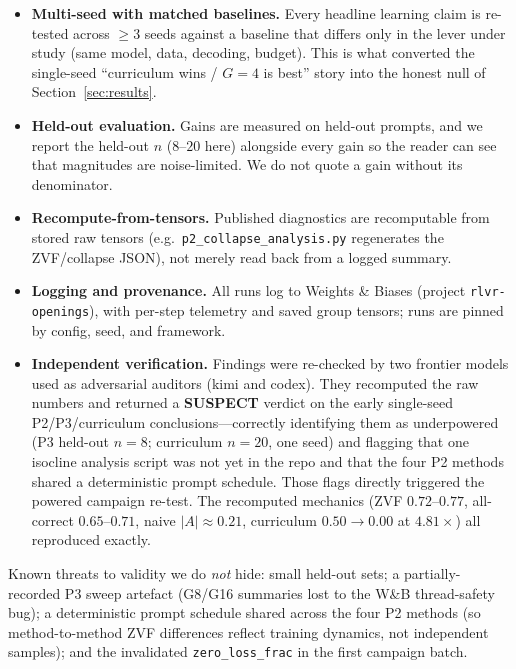\documentclass[12pt,a4paper]{report}
\begin{document}
\begin{itemize}[leftmargin=1.4em,itemsep=2pt]
  \item \textbf{Multi-seed with matched baselines.} Every headline learning claim
  is re-tested across $\ge 3$ seeds against a baseline that differs only in the
  lever under study (same model, data, decoding, budget). This is what converted
  the single-seed ``curriculum wins / $G{=}4$ is best'' story into the honest
  null of Section~\ref{sec:results}.
  \item \textbf{Held-out evaluation.} Gains are measured on held-out prompts, and
  we report the held-out $n$ ($8$--$20$ here) alongside every gain so the reader
  can see that magnitudes are noise-limited. We do not quote a gain without its
  denominator.
  \item \textbf{Recompute-from-tensors.} Published diagnostics are recomputable
  from stored raw tensors (e.g.\ \texttt{p2\_collapse\_analysis.py} regenerates
  the ZVF/collapse JSON), not merely read back from a logged summary.
  \item \textbf{Logging and provenance.} All runs log to Weights \& Biases
  (project \texttt{rlvr-openings}), with per-step telemetry and saved group
  tensors; runs are pinned by config, seed, and framework.
  \item \textbf{Independent verification.} Findings were re-checked by two
  frontier models used as adversarial auditors (kimi and codex). They recomputed
  the raw numbers and returned a \textbf{SUSPECT} verdict on the early
  single-seed P2/P3/curriculum conclusions---correctly identifying them as
  underpowered (P3 held-out $n=8$; curriculum $n=20$, one seed) and flagging that
  one isocline analysis script was not yet in the repo and that the four P2
  methods shared a deterministic prompt schedule. Those flags directly triggered
  the powered campaign re-test. The recomputed mechanics
  (ZVF $0.72$--$0.77$, all-correct $0.65$--$0.71$, naive $|A|\approx0.21$,
  curriculum $0.50\to0.00$ at $4.81\times$) all reproduced exactly.
\end{itemize}

Known threats to validity we do \emph{not} hide: small held-out sets; a
partially-recorded P3 sweep artefact (G8/G16 summaries lost to the W\&B
thread-safety bug); a deterministic prompt schedule shared across the four P2
methods (so method-to-method ZVF differences reflect training dynamics, not
independent samples); and the invalidated \texttt{zero\_loss\_frac} in the first
campaign batch.
\end{document}
